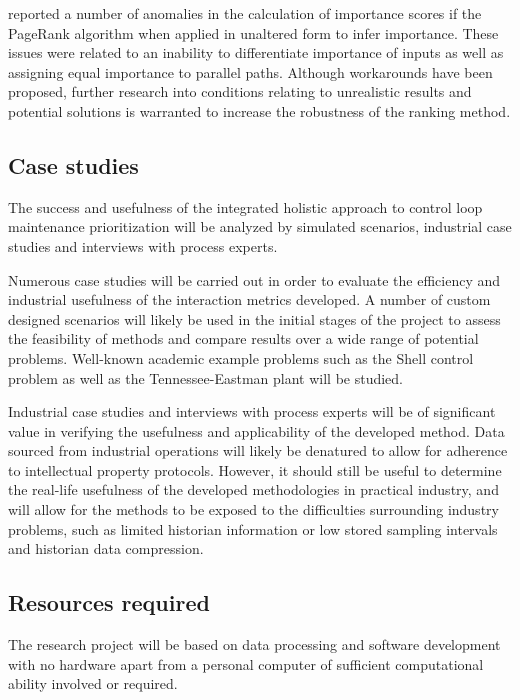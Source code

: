 \documentclass{article}
\begin{document}
\citet{Wilken2012} reported a number of anomalies in the calculation of importance scores if the PageRank algorithm when applied in unaltered form to infer importance. These issues were related to an inability to differentiate importance of inputs as well as assigning equal importance to parallel paths. Although workarounds have been proposed, further research into conditions relating to unrealistic results and potential solutions is warranted to increase the robustness of the ranking method.


\subsection{Case studies}

The success and usefulness of the integrated holistic approach to control loop maintenance prioritization will be analyzed by simulated scenarios, industrial case studies and interviews with process experts.

Numerous case studies will be carried out in order to evaluate the efficiency and industrial usefulness of the interaction metrics developed.
A number of custom designed scenarios will likely be used in the initial stages of the project to assess the feasibility of methods and compare results over a wide range of potential problems.
Well-known academic example problems such as the Shell control problem as well as the Tennessee-Eastman plant will be studied.

Industrial case studies and interviews with process experts will be of significant value in verifying the usefulness and applicability of the developed method.
Data sourced from industrial operations will likely be denatured to allow for adherence to intellectual property protocols.
However, it should still be useful to determine the real-life usefulness of the developed methodologies in practical industry, and will allow for the methods to be exposed to the difficulties surrounding industry problems, such as limited historian information or low stored sampling intervals and historian data compression.

\subsection{Resources required}

The research project will be based on data processing and software development with no hardware apart from a personal computer of sufficient computational ability involved or required.
\end{document}
